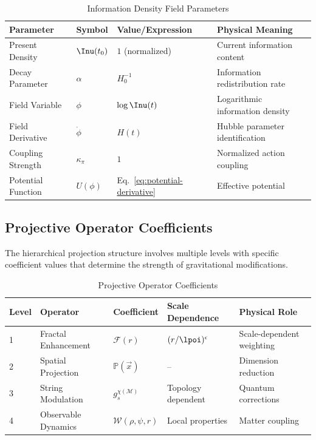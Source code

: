 \begin{table}[H]
  \caption{Information Density Field Parameters}
  \label{tab:information-density-parameters}
  \centering
  \begin{tabular}{@{}llll@{}}
    \toprule
    \textbf{Parameter} & \textbf{Symbol} & \textbf{Value/Expression} & \textbf{Physical Meaning} \\
    \midrule
    Present Density     & $\Inu(t_0)$ & $1$ (normalized) & Current information content \\
    Decay Parameter     & $\alpha$    & $H_0^{-1}$       & Information redistribution rate \\
    Field Variable      & $\phi$      & $\log \Inu(t)$   & Logarithmic information density \\
    Field Derivative    & $\dot{\phi}$& $H(t)$           & Hubble parameter identification \\
    Coupling Strength   & $\kappa_\pi$& $1$              & Normalized action coupling \\
    Potential Function  & $U(\phi)$   & Eq.~\ref{eq:potential-derivative} & Effective potential \\
    \bottomrule
  \end{tabular}
\end{table}

\subsection{Projective Operator Coefficients}
\label{subsec:projective-coefficients}

The hierarchical projection structure involves multiple levels with specific coefficient values that determine the strength of gravitational modifications.

\begin{table}[H]
  \caption{Projective Operator Coefficients}
  \label{tab:projective-coefficients}
  \centering
  \begin{tabular}{@{}lllll@{}}
    \toprule
    \textbf{Level} & \textbf{Operator} & \textbf{Coefficient} & \textbf{Scale Dependence} & \textbf{Physical Role} \\
    \midrule
    1 & Fractal Enhancement & $\mathcal{F}(r)$           & $(r/\lpoi)^{\epsilon}$ & Scale-dependent weighting \\
    2 & Spatial Projection  & $\mathbb{P}(\vec{x})$      & --                      & Dimension reduction \\
    3 & String Modulation   & $g_s^{\chi(\mathcal{M})}$  & Topology dependent      & Quantum corrections \\
    4 & Observable Dynamics & $\mathcal{W}(\rho,\psi,r)$ & Local properties        & Matter coupling \\
    \bottomrule
  \end{tabular}
\end{table}

